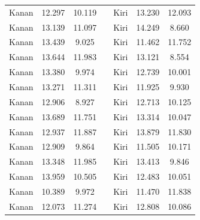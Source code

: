 \begin{longtable}{|c|c|c|c|c|c|c|}
  Kanan          & 12.297              & 10.119           &  & Kiri           & 13.230              & 12.093           \\ \cline{1-3} \cline{5-7} 
  Kanan          & 13.139              & 11.097           &  & Kiri           & 14.249              & 8.660            \\ \cline{1-3} \cline{5-7} 
  Kanan          & 13.439              & 9.025            &  & Kiri           & 11.462              & 11.752           \\ \cline{1-3} \cline{5-7} 
  Kanan          & 13.644              & 11.983           &  & Kiri           & 13.121              & 8.554            \\ \cline{1-3} \cline{5-7} 
  Kanan          & 13.380              & 9.974            &  & Kiri           & 12.739              & 10.001           \\ \cline{1-3} \cline{5-7} 
  Kanan          & 13.271              & 11.311           &  & Kiri           & 11.925              & 9.930            \\ \cline{1-3} \cline{5-7} 
  Kanan          & 12.906              & 8.927            &  & Kiri           & 12.713              & 10.125           \\ \cline{1-3} \cline{5-7} 
  Kanan          & 13.689              & 11.751           &  & Kiri           & 13.314              & 10.047           \\ \cline{1-3} \cline{5-7} 
  Kanan          & 12.937              & 11.887           &  & Kiri           & 13.879              & 11.830           \\ \cline{1-3} \cline{5-7} 
  Kanan          & 12.909              & 9.864            &  & Kiri           & 11.505              & 10.171           \\ \cline{1-3} \cline{5-7} 
  Kanan          & 13.348              & 11.985           &  & Kiri           & 13.413              & 9.846            \\ \cline{1-3} \cline{5-7} 
  Kanan          & 13.959              & 10.505           &  & Kiri           & 12.483              & 10.051           \\ \cline{1-3} \cline{5-7} 
  Kanan          & 10.389              & 9.972            &  & Kiri           & 11.470              & 11.838           \\ \cline{1-3} \cline{5-7} 
  Kanan          & 12.073              & 11.274           &  & Kiri           & 12.808              & 10.086           \\ \cline{1-3} \cline{5-7} 

\end{longtable}
